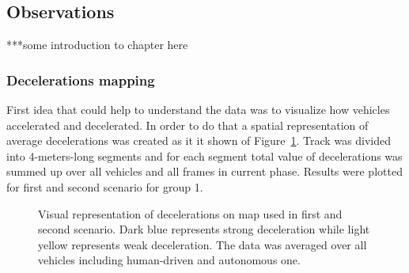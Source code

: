 \documentclass[11pt,english]{article}
\begin{document}
\subsection{Observations}

***some introduction to chapter here






\subsubsection{Decelerations mapping}

First idea that could help to understand the data was to visualize how vehicles accelerated and decelerated. In order to do that a spatial representation of average decelerations was created as it it shown of Figure~\ref{fig:decelerations1}. Track was divided into 4-meters-long segments and for each segment total value of decelerations was summed up over all vehicles and all frames in current phase. Results were plotted for first and second scenario for group 1.


\begin{figure}[h]
\centering
{}


\caption{Visual representation of decelerations on map used in first and second scenario. Dark blue represents strong deceleration while light yellow represents weak deceleration. The data was averaged over all vehicles including human-driven and autonomous one.}
\label{fig:decelerations1}
\end{figure}
\end{document}
